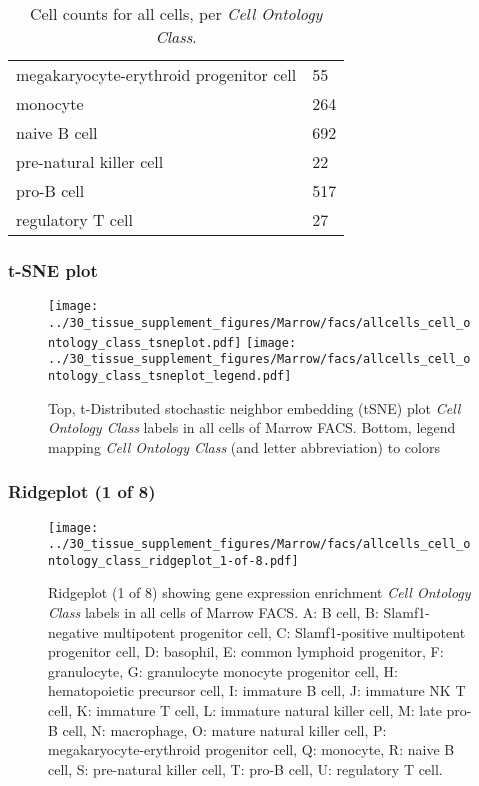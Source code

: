 \begin{table}[h]
\begin{tabular}{@{}ll@{}}
megakaryocyte-erythroid progenitor cell & 55 \\

monocyte & 264 \\

naive B cell & 692 \\

pre-natural killer cell & 22 \\

pro-B cell & 517 \\

regulatory T cell & 27 \\
\bottomrule
\end{tabular}
\caption{Cell counts for all cells, per \emph{Cell Ontology Class}.}
\end{table}

\clearpage
\subsubsection{t-SNE plot}
\begin{figure}[h]
\centering
\texttt{[image: ../30\_tissue\_supplement\_figures/Marrow/facs/allcells\_cell\_ontology\_class\_tsneplot.pdf]}
\texttt{[image: ../30\_tissue\_supplement\_figures/Marrow/facs/allcells\_cell\_ontology\_class\_tsneplot\_legend.pdf]}
\caption{Top, t-Distributed stochastic neighbor embedding (tSNE) plot  \emph{Cell Ontology Class} labels in all cells of Marrow FACS. Bottom, legend mapping \emph{Cell Ontology Class} (and letter abbreviation) to colors}
\end{figure}


\clearpage

\subsubsection{Ridgeplot (1 of 8)}
\begin{figure}[h]
\centering
\texttt{[image: ../30\_tissue\_supplement\_figures/Marrow/facs/allcells\_cell\_ontology\_class\_ridgeplot\_1-of-8.pdf]}

\caption{ Ridgeplot (1 of 8)  showing gene expression enrichment \emph{Cell Ontology Class} labels in all cells of Marrow FACS. A: B cell, B: Slamf1-negative multipotent progenitor cell, C: Slamf1-positive multipotent progenitor cell, D: basophil, E: common lymphoid progenitor, F: granulocyte, G: granulocyte monocyte progenitor cell, H: hematopoietic precursor cell, I: immature B cell, J: immature NK T cell, K: immature T cell, L: immature natural killer cell, M: late pro-B cell, N: macrophage, O: mature natural killer cell, P: megakaryocyte-erythroid progenitor cell, Q: monocyte, R: naive B cell, S: pre-natural killer cell, T: pro-B cell, U: regulatory T cell.}
\end{figure}


